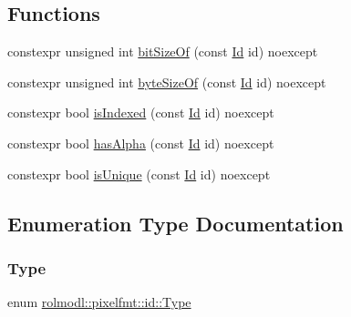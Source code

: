 \subsection*{Functions}
\begin{DoxyCompactItemize}
\item 
constexpr unsigned int \mbox{\hyperlink{namespacerolmodl_1_1pixelfmt_1_1id_ad7076e31a353e4ecdd013d7d106b9b74}{bit\+Size\+Of}} (const \mbox{\hyperlink{namespacerolmodl_1_1pixelfmt_a96282713e4465ba9211c8fd3a702b52b}{Id}} id) noexcept
\item 
constexpr unsigned int \mbox{\hyperlink{namespacerolmodl_1_1pixelfmt_1_1id_ae16c4d4a919e9299f3dd3885085dc858}{byte\+Size\+Of}} (const \mbox{\hyperlink{namespacerolmodl_1_1pixelfmt_a96282713e4465ba9211c8fd3a702b52b}{Id}} id) noexcept
\item 
constexpr bool \mbox{\hyperlink{namespacerolmodl_1_1pixelfmt_1_1id_a64b0b7234a34c6116171adebd11888e8}{is\+Indexed}} (const \mbox{\hyperlink{namespacerolmodl_1_1pixelfmt_a96282713e4465ba9211c8fd3a702b52b}{Id}} id) noexcept
\item 
constexpr bool \mbox{\hyperlink{namespacerolmodl_1_1pixelfmt_1_1id_adab6c8132dabf85b18b3a3442890eeba}{has\+Alpha}} (const \mbox{\hyperlink{namespacerolmodl_1_1pixelfmt_a96282713e4465ba9211c8fd3a702b52b}{Id}} id) noexcept
\item 
constexpr bool \mbox{\hyperlink{namespacerolmodl_1_1pixelfmt_1_1id_a478cbf9d8ceccbc4ebf8758d05ed2f2d}{is\+Unique}} (const \mbox{\hyperlink{namespacerolmodl_1_1pixelfmt_a96282713e4465ba9211c8fd3a702b52b}{Id}} id) noexcept
\end{DoxyCompactItemize}


\subsection{Enumeration Type Documentation}
\mbox{\label{namespacerolmodl_1_1pixelfmt_1_1id_acacda2442a2997fe425e2faa4e5d002b}} 
\subsubsection{\texorpdfstring{Type}{Type}}
{\footnotesize\ttfamily enum \mbox{\hyperlink{namespacerolmodl_1_1pixelfmt_1_1id_acacda2442a2997fe425e2faa4e5d002b}{rolmodl\+::pixelfmt\+::id\+::\+Type}}\hspace{0.3cm}{\ttfamily [strong]}}

